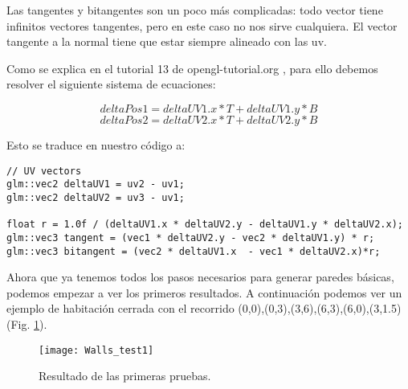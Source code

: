 Las tangentes y bitangentes son un poco más complicadas: todo vector tiene infinitos vectores tangentes, pero en este caso no nos sirve cualquiera. El vector tangente a la normal tiene que estar siempre alineado con las uv.

Como se explica en el tutorial 13 de opengl-tutorial.org \cite{opengltutorials}, para ello debemos resolver el siguiente sistema de ecuaciones:


\[ deltaPos1 = deltaUV1.x * T + deltaUV1.y * B \]
\[ deltaPos2 = deltaUV2.x * T + deltaUV2.y * B \]

Esto se traduce en nuestro código a:

\begin{lstlisting}
// UV vectors
glm::vec2 deltaUV1 = uv2 - uv1;
glm::vec2 deltaUV2 = uv3 - uv1;

float r = 1.0f / (deltaUV1.x * deltaUV2.y - deltaUV1.y * deltaUV2.x);
glm::vec3 tangent = (vec1 * deltaUV2.y - vec2 * deltaUV1.y) * r;
glm::vec3 bitangent = (vec2 * deltaUV1.x  - vec1 * deltaUV2.x)*r;
\end{lstlisting}

Ahora que ya tenemos todos los pasos necesarios para generar paredes básicas, podemos empezar a ver los primeros resultados. A continuación podemos ver un ejemplo de habitación cerrada con el recorrido (0,0),(0,3),(3,6),(6,3),(6,0),(3,1.5) (Fig. \ref{fig:walls_test_1}).

\begin{figure}[H]
    \centering
    \texttt{[image: Walls\_test1]}
    \caption{Resultado de las primeras pruebas.}
    \label{fig:walls_test_1}
\end{figure}
